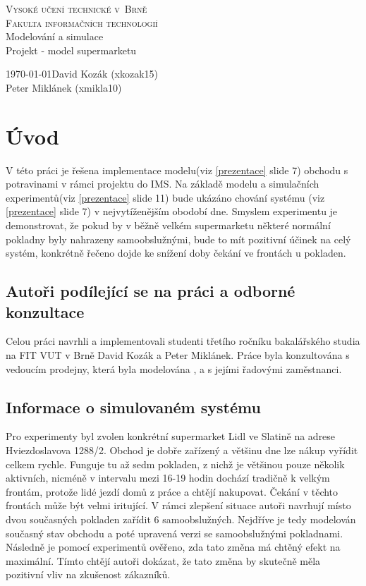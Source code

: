 \documentclass[12pt,a4paper,titlepage]{article}
\begin{document}
\begin{titlepage}
\begin{center}
    {
    	\Huge\textsc{Vysoké učení technické v~Brně}}\\
    \smallskip
    {
    	\huge\textsc{Fakulta informačních technologií}}\\
    \bigskip
    \huge{Modelování a simulace}\\
    \smallskip
    \Huge{Projekt - model supermarketu}\\
\end{center}
    {\Large \today \hfill David Kozák (xkozak15)  }\\
    \smallskip
    {\Large \hfill Peter Miklánek (xmikla10)}
\end{titlepage}

\newpage
\tableofcontents
\newpage

\section{Úvod}
V této práci je řešena implementace modelu(viz \ref{prezentace} slide 7) obchodu s potravinami v rámci projektu do IMS.
Na základě modelu a simulačních experimentů(viz \ref{prezentace} slide 11) bude ukázáno chování systému (viz \ref{prezentace} slide 7) v nejvytíženějším obodobí dne. Smyslem experimentu je demonstrovat, že pokud by v běžně velkém supermarketu některé normální pokladny byly nahrazeny samoobslužnými, bude to mít pozitivní účinek na celý systém, konkrétně řečeno dojde ke snížení doby čekání ve frontách u pokladen.
\subsection{Autoři podílející se na práci a odborné konzultace}
Celou práci navrhli a implementovali studenti třetího ročníku bakalářského studia na FIT VUT v Brně David Kozák a Peter Miklánek. Práce byla konzultována s vedoucím prodejny, která byla modelována , a s jejími řadovými zaměstnanci. 
\subsection{Informace o simulovaném systému}
Pro experimenty byl zvolen konkrétní supermarket Lidl ve Slatině na adrese Hviezdoslavova 1288/2. Obchod je dobře zařízený a většinu dne lze nákup vyřídit celkem rychle. Funguje tu až sedm pokladen, z nichž je většinou pouze několik aktivních, nicméně v intervalu mezi 16-19 hodin dochází tradičně k velkým frontám, protože lidé jezdí domů z práce a chtějí nakupovat. Čekání v těchto frontách může být velmi iritující. V rámci zlepšení situace autoři navrhují místo dvou současných pokladen zařídit 6 samoobslužných. Nejdříve je tedy modelován současný stav obchodu a poté upravená verzi se samoobslužnými pokladnami. Následně je pomocí experimentů ověřeno, zda tato změna má chtěný efekt na maximální. Tímto chtějí autoři dokázat, že tato změna by skutečně měla pozitivní vliv na zkušenost zákazníků.
\end{document}
